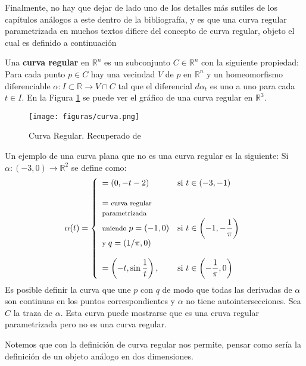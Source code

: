 \documentclass[oneside,11pt]{memoir}
\begin{document}
 Finalmente, no hay que dejar de lado uno de los detalles más sutiles de los capítulos análogos a este dentro de la bibliografía, y es que una curva regular parametrizada en muchos textos difiere del concepto de curva regular, objeto el cual es definido a continuación
 \begin{definition}
Una \textbf{curva regular} en $\mathbb{R}^n$ es un subconjunto $C\in \mathbb{R}^n$ con la siguiente propiedad: Para cada punto $p \in C$ hay una vecindad $V$ de $p$ en $\mathbb{R}^n$ y un homeomorfismo diferenciable $\alpha:I\subset \mathbb{R}\to V\cap C$ tal que el diferencial $d\alpha_t$ es uno a uno para cada $t\in I$. En la Figura \ref{fig:curvareg} se puede ver el gráfico de una curva regular en $\mathbb{R}^3$.
 \end{definition}
\begin{figure}[h]
    \centering
    \texttt{[image: figuras/curva.png]}
    \caption{Curva Regular. Recuperado de \cite[p.~78]{do2016differential} }
    \label{fig:curvareg}
\end{figure}
Un ejemplo de una curva plana que no es una curva regular es la siguiente: Si $\alpha:(-3,0)\to \mathbb{R}^2$ se define como:
\begin{align*}
\alpha(t)=\left\{\begin{array}{ll}
         =(0,-t-2)& \text{si }t\in(-3,-1)  \\
         \\
         =\text{\footnotesize curva regular}&  \\
         \text{\footnotesize parametrizada}&\\
         \text{\footnotesize uniendo }p=(-1,0)&  \text{si }t\in\left(-1,-\dfrac{1}{\pi}\right)\\
         \text{\footnotesize y }q=(1/\pi,0)&  \\
         \\
         =\left(-t,\sin\dfrac{1}{t}\right),&\text{si } t\in \left(-\dfrac{1}{\pi},0\right)
    \end{array}
    \right.
\end{align*}
Es posible definir la curva que une $p$ con $q$ de modo que todas las derivadas de $\alpha$ son continuas en los puntos correspondientes y $\alpha$ no tiene autointersecciones. Sea $C$ la traza de $\alpha$. Esta curva puede mostrarse que es una cruva regular parametrizada pero no es una curva regular.

Notemos que con la definición de curva regular nos permite, pensar como sería la definición de un objeto análogo en dos dimensiones.
\end{document}
